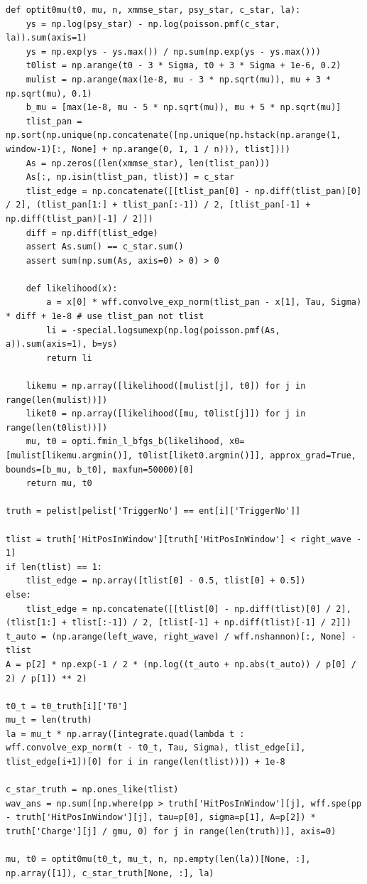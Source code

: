 \documentclass[notitlepage]{article}
\begin{document}
\begin{lstlisting}
def optit0mu(t0, mu, n, xmmse_star, psy_star, c_star, la):
    ys = np.log(psy_star) - np.log(poisson.pmf(c_star, la)).sum(axis=1)
    ys = np.exp(ys - ys.max()) / np.sum(np.exp(ys - ys.max()))
    t0list = np.arange(t0 - 3 * Sigma, t0 + 3 * Sigma + 1e-6, 0.2)
    mulist = np.arange(max(1e-8, mu - 3 * np.sqrt(mu)), mu + 3 * np.sqrt(mu), 0.1)
    b_mu = [max(1e-8, mu - 5 * np.sqrt(mu)), mu + 5 * np.sqrt(mu)]
    tlist_pan = np.sort(np.unique(np.concatenate([np.unique(np.hstack(np.arange(1, window-1)[:, None] + np.arange(0, 1, 1 / n))), tlist])))
    As = np.zeros((len(xmmse_star), len(tlist_pan)))
    As[:, np.isin(tlist_pan, tlist)] = c_star
    tlist_edge = np.concatenate([[tlist_pan[0] - np.diff(tlist_pan)[0] / 2], (tlist_pan[1:] + tlist_pan[:-1]) / 2, [tlist_pan[-1] + np.diff(tlist_pan)[-1] / 2]])
    diff = np.diff(tlist_edge)
    assert As.sum() == c_star.sum()
    assert sum(np.sum(As, axis=0) > 0) > 0

    def likelihood(x):
        a = x[0] * wff.convolve_exp_norm(tlist_pan - x[1], Tau, Sigma) * diff + 1e-8 # use tlist_pan not tlist
        li = -special.logsumexp(np.log(poisson.pmf(As, a)).sum(axis=1), b=ys)
        return li

    likemu = np.array([likelihood([mulist[j], t0]) for j in range(len(mulist))])
    liket0 = np.array([likelihood([mu, t0list[j]]) for j in range(len(t0list))])
    mu, t0 = opti.fmin_l_bfgs_b(likelihood, x0=[mulist[likemu.argmin()], t0list[liket0.argmin()]], approx_grad=True, bounds=[b_mu, b_t0], maxfun=50000)[0]
    return mu, t0

truth = pelist[pelist['TriggerNo'] == ent[i]['TriggerNo']]

tlist = truth['HitPosInWindow'][truth['HitPosInWindow'] < right_wave - 1]
if len(tlist) == 1:
    tlist_edge = np.array([tlist[0] - 0.5, tlist[0] + 0.5])
else:
    tlist_edge = np.concatenate([[tlist[0] - np.diff(tlist)[0] / 2], (tlist[1:] + tlist[:-1]) / 2, [tlist[-1] + np.diff(tlist)[-1] / 2]])
t_auto = (np.arange(left_wave, right_wave) / wff.nshannon)[:, None] - tlist
A = p[2] * np.exp(-1 / 2 * (np.log((t_auto + np.abs(t_auto)) / p[0] / 2) / p[1]) ** 2)

t0_t = t0_truth[i]['T0']
mu_t = len(truth)
la = mu_t * np.array([integrate.quad(lambda t : wff.convolve_exp_norm(t - t0_t, Tau, Sigma), tlist_edge[i], tlist_edge[i+1])[0] for i in range(len(tlist))]) + 1e-8

c_star_truth = np.ones_like(tlist)
wav_ans = np.sum([np.where(pp > truth['HitPosInWindow'][j], wff.spe(pp - truth['HitPosInWindow'][j], tau=p[0], sigma=p[1], A=p[2]) * truth['Charge'][j] / gmu, 0) for j in range(len(truth))], axis=0)

mu, t0 = optit0mu(t0_t, mu_t, n, np.empty(len(la))[None, :], np.array([1]), c_star_truth[None, :], la)
\end{lstlisting}
\end{document}
